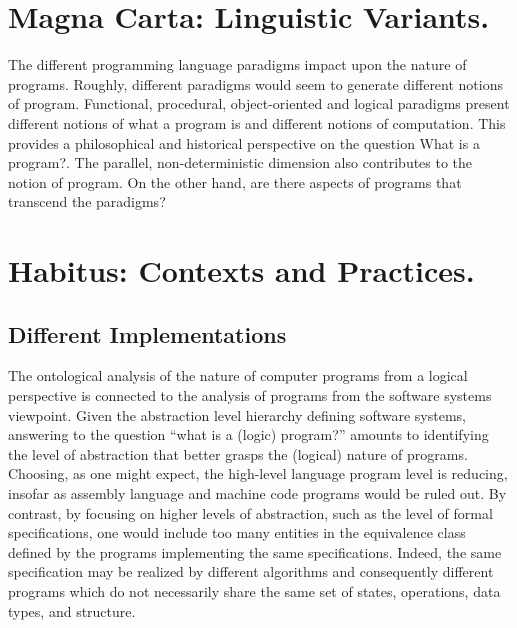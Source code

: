 \documentclass[]{article}
\begin{document}
{\color{red}{Tomas?}}

{\color{red}{Wendy?}}


\section{Magna Carta: Linguistic Variants.}

{\color{red}{Ray's note}}

The different programming language paradigms impact upon the nature of programs. Roughly, different paradigms would seem to generate different notions of program. Functional, procedural, object-oriented and logical paradigms present different notions of what a program is and different notions of computation. This provides a philosophical and historical perspective on the question What is a program?. The parallel, non-deterministic dimension also contributes to the notion of program. On the other hand, are there aspects of programs that transcend the paradigms? 



\section{Habitus: Contexts and Practices.}


\subsection{Different Implementations}

{\color{red}{GP?}}

The ontological analysis of the nature of computer programs from a logical perspective is connected to the analysis of programs from the software systems viewpoint. Given the abstraction level hierarchy defining software systems, answering to the question ``what is a (logic) program?” amounts to identifying the level of abstraction that better grasps the (logical) nature of programs. Choosing, as one might expect,
the high-level language program level is reducing, insofar as assembly language and machine
code programs would be ruled out. By contrast, by focusing on higher levels of abstraction, such
as the level of formal specifications, one would include too many entities in the equivalence
class defined by the programs implementing the same specifications. Indeed, the same
specification may be realized by different algorithms and consequently different programs which
do not necessarily share the same set of states, operations, data types, and structure.
\end{document}
